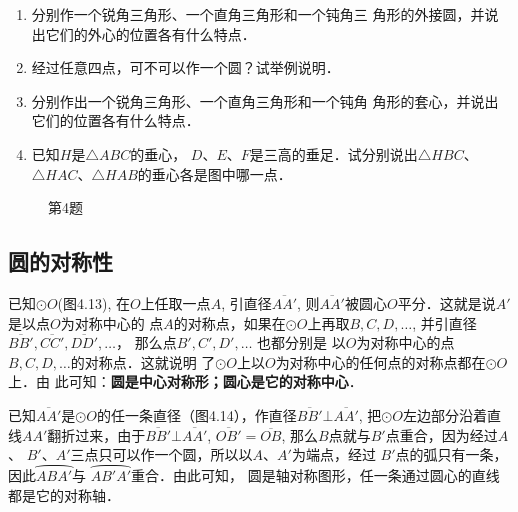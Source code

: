 \begin{ex}
\begin{enumerate}
    \item 分别作一个锐角三角形、一个直角三角形和一个钝角三
    角形的外接圆，并说出它们的外心的位置各有什么特点．
    \item 经过任意四点，可不可以作一个圆？试举例说明．
    \item 分别作出一个锐角三角形、一个直角三角形和一个钝角
    角形的套心，并说出它们的位置各有什么特点．
    \item 已知$H$是$\triangle ABC$的垂心，
    $D$、$E$、$F$是三高的垂足．试分别说出$\triangle HBC$、$\triangle HAC$、$\triangle HAB$的垂心各是图中哪一点．
\end{enumerate}
\end{ex}

\begin{figure}[htp]
    \centering
{}
    \caption*{第4题}
\end{figure}

\subsection{圆的对称性}
已知$\odot O$(图4.13), 在$O$上任取一点$A$, 引直径$\overline{AA'}$, 
则$\overline{AA'}$被圆心$O$平分．这就是说$A'$是以点$O$为对称中心的
点$A$的对称点，如果在$\odot O$上再取$B,C,D,\ldots$, 并引直径
$\overline{BB'},\overline{CC'},\overline{DD'},\ldots$， 那么点$B',C',D',\ldots$ 也都分别是
以$O$为对称中心的点$B,C,D,\ldots$的对称点．这就说明
了$\odot O$上以$O$为对称中心的任何点的对称点都在$\odot O$上．由
此可知：\textbf{圆是中心对称形；圆心是它的对称中心}．

已知$\overline{AA'}$是$\odot O$的任一条直径（图4.14），作直径$\overline{BB'}\bot 
\overline{AA'}$, 把$\odot O$左边部分沿着直线$AA'$翻折过来，由于$\overline{BB'}\bot \overline{AA'}$, $\overline{OB'}=\overline{OB}$, 那么$B$点就与$B'$点重合，因为经过$A$、
$B'$、$A'$三点只可以作一个圆，所以以$A$、$A'$为端点，经过
$B'$点的弧只有一条，因此$\wideparen{ABA'}$与
$\wideparen{AB'A'}$重合．由此可知，
圆是轴对称图形，任一条通过圆心的直线都是它的对称轴．

